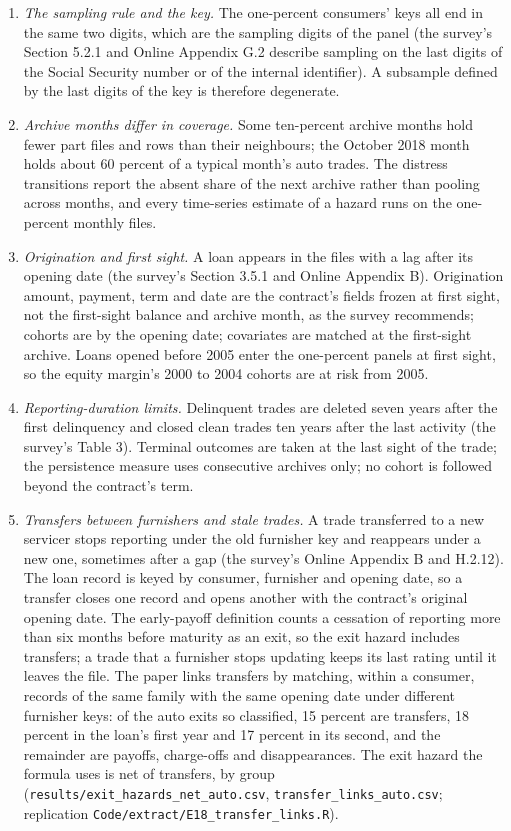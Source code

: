 \begin{enumerate}
\item \emph{The sampling rule and the key.} The one-percent consumers' keys all end in the same two digits, which are the sampling digits of the panel (the survey's Section 5.2.1 and Online Appendix G.2 describe sampling on the last digits of the Social Security number or of the internal identifier). A subsample defined by the last digits of the key is therefore degenerate.

\item \emph{Archive months differ in coverage.} Some ten-percent archive months hold fewer part files and rows than their neighbours; the October 2018 month holds about 60 percent of a typical month's auto trades. The distress transitions report the absent share of the next archive rather than pooling across months, and every time-series estimate of a hazard runs on the one-percent monthly files.

\item \emph{Origination and first sight.} A loan appears in the files with a lag after its opening date (the survey's Section 3.5.1 and Online Appendix B). Origination amount, payment, term and date are the contract's fields frozen at first sight, not the first-sight balance and archive month, as the survey recommends; cohorts are by the opening date; covariates are matched at the first-sight archive. Loans opened before 2005 enter the one-percent panels at first sight, so the equity margin's 2000 to 2004 cohorts are at risk from 2005.

\item \emph{Reporting-duration limits.} Delinquent trades are deleted seven years after the first delinquency and closed clean trades ten years after the last activity (the survey's Table 3). Terminal outcomes are taken at the last sight of the trade; the persistence measure uses consecutive archives only; no cohort is followed beyond the contract's term.

\item \emph{Transfers between furnishers and stale trades.} A trade transferred to a new servicer stops reporting under the old furnisher key and reappears under a new one, sometimes after a gap (the survey's Online Appendix B and H.2.12). The loan record is keyed by consumer, furnisher and opening date, so a transfer closes one record and opens another with the contract's original opening date. The early-payoff definition counts a cessation of reporting more than six months before maturity as an exit, so the exit hazard includes transfers; a trade that a furnisher stops updating keeps its last rating until it leaves the file. The paper links transfers by matching, within a consumer, records of the same family with the same opening date under different furnisher keys: of the auto exits so classified, 15 percent are transfers, 18 percent in the loan's first year and 17 percent in its second, and the remainder are payoffs, charge-offs and disappearances. The exit hazard the formula uses is net of transfers, by group (\texttt{results/exit\_hazards\_net\_auto.csv}, \texttt{transfer\_links\_auto.csv}; replication \texttt{Code/extract/E18\_transfer\_links.R}).

\end{enumerate}

